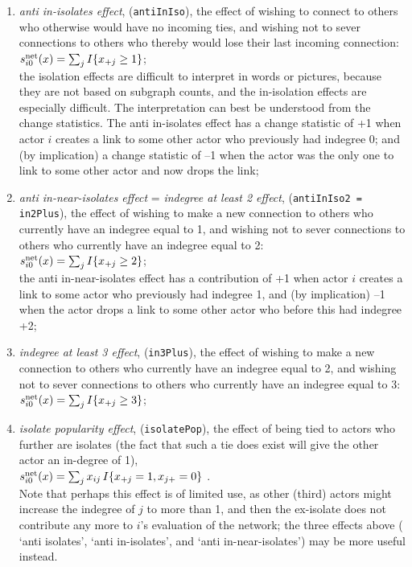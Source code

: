 \documentclass[a4paper,fleqn,11pt]{article}
\newcommand{\+}{\, + \,}
\newcommand{\vit}{\theenumi}
\newcounter{savenumi}
\begin{document}
\begin{enumerate}
\item \emph{anti in-isolates effect}, (\texttt{antiInIso}), the effect of
      wishing to connect to others who otherwise would have
      no incoming ties, and wishing not to sever connections to
      others who thereby would lose their last incoming connection: \\
$s^{\rm net}_{i\vit}(x) = \sum_j I\{x_{+j} \geq 1 \} $;\\
     the isolation effects are difficult to interpret in words or pictures,
     because they are not based on subgraph counts, and the in-isolation
     effects are especially difficult.
     The interpretation can best be understood from the change statistics.
     The anti in-isolates effect has a change statistic of +1 when actor $i$
     creates a link to some other actor who previously had indegree 0; and
     (by implication) a change statistic of --1 when the actor was the only one to link to some
     other actor and now drops the link;

\item \emph{anti in-near-isolates effect}
 = \emph{indegree at least 2 effect}, (\texttt{antiInIso2 = in2Plus}),
      the effect of
      wishing to make a new connection to others who currently have
      an indegree equal to 1, and wishing not to sever connections to
      others who currently have an indegree equal to 2:\\
$s^{\rm net}_{i\vit}(x) = \sum_j I\{x_{+j} \geq 2 \} $;\\
    the anti in-near-isolates effect has a contribution of +1 when actor $i$
     creates a link to some actor who previously had indegree 1, and
     (by implication) --1 when the actor drops a link to some
     other actor who before this had indegree +2;

\item \emph{indegree at least 3 effect}, (\texttt{in3Plus}),
      the effect of
      wishing to make a new connection to others who currently have
      an indegree equal to 2, and wishing not to sever connections to
      others who currently have an indegree equal to 3:\\
$s^{\rm net}_{i\vit}(x) = \sum_j I\{x_{+j} \geq 3 \} $;

\item \emph{isolate popularity effect}, (\texttt{isolatePop}), the effect of
      being tied to actors who further are isolates
      (the fact that such a tie does exist will give the other actor
      an in-degree of 1),\\
$s^{\rm net}_{i\vit}(x) = \sum_j x_{ij}\, I\{x_{+j} = 1, x_{j+} = 0 \} $ .\\
     Note that perhaps this effect is of limited use, as other (third) actors
     might increase the indegree of $j$ to more than 1, and then the ex-isolate
     does not contribute any more to $i$'s evaluation of the network;
     the three effects above ( `anti isolates', `anti in-isolates',
     and `anti in-near-isolates') may be more useful instead.
\setcounter{savenumi}{\value{enumi}}
\end{enumerate}
\end{document}

